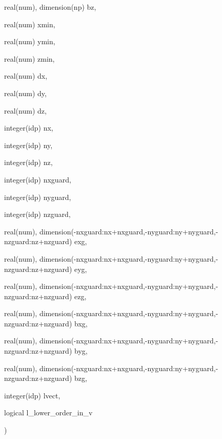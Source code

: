 {\begin{DoxyParamCaption}
\item[{real(num), dimension(np)}]{bz, }
\item[{real(num)}]{xmin, }
\item[{real(num)}]{ymin, }
\item[{real(num)}]{zmin, }
\item[{real(num)}]{dx, }
\item[{real(num)}]{dy, }
\item[{real(num)}]{dz, }
\item[{integer(idp)}]{nx, }
\item[{integer(idp)}]{ny, }
\item[{integer(idp)}]{nz, }
\item[{integer(idp)}]{nxguard, }
\item[{integer(idp)}]{nyguard, }
\item[{integer(idp)}]{nzguard, }
\item[{real(num), dimension(-\/nxguard\+:nx+nxguard,-\/nyguard\+:ny+nyguard,-\/nzguard\+:nz+nzguard)}]{exg, }
\item[{real(num), dimension(-\/nxguard\+:nx+nxguard,-\/nyguard\+:ny+nyguard,-\/nzguard\+:nz+nzguard)}]{eyg, }
\item[{real(num), dimension(-\/nxguard\+:nx+nxguard,-\/nyguard\+:ny+nyguard,-\/nzguard\+:nz+nzguard)}]{ezg, }
\item[{real(num), dimension(-\/nxguard\+:nx+nxguard,-\/nyguard\+:ny+nyguard,-\/nzguard\+:nz+nzguard)}]{bxg, }
\item[{real(num), dimension(-\/nxguard\+:nx+nxguard,-\/nyguard\+:ny+nyguard,-\/nzguard\+:nz+nzguard)}]{byg, }
\item[{real(num), dimension(-\/nxguard\+:nx+nxguard,-\/nyguard\+:ny+nyguard,-\/nzguard\+:nz+nzguard)}]{bzg, }
\item[{integer(idp)}]{lvect, }
\item[{logical}]{l\+\_\+lower\+\_\+order\+\_\+in\+\_\+v}
\end{DoxyParamCaption}
)}\hypertarget{field__gathering_8_f90_a6e3a3b1519fdd7090c55244b49a8d80f}{}\label{field__gathering_8_f90_a6e3a3b1519fdd7090c55244b49a8d80f}
